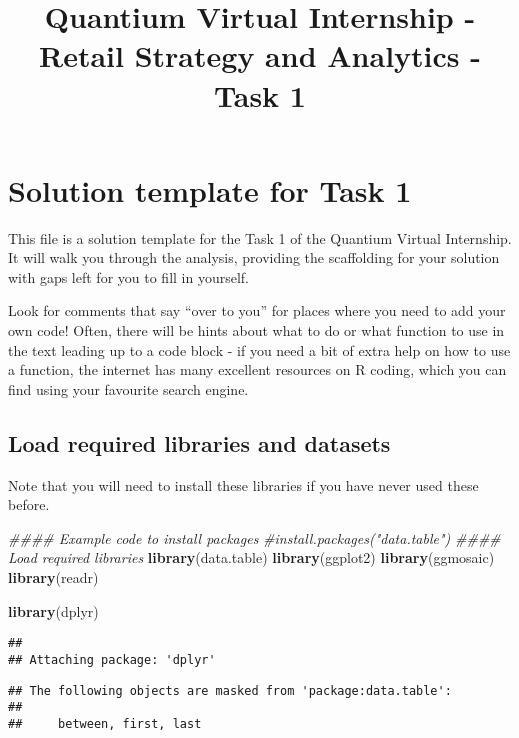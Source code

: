 \documentclass[]{article}
\title{Quantium Virtual Internship - Retail Strategy and Analytics - Task 1}
\author{}
\date{\vspace{-2.5em}}
\newenvironment{Shaded}{\begin{snugshade}}{\end{snugshade}}
\newcommand{\CommentTok}[1]{\textcolor[rgb]{0.56,0.35,0.01}{\textit{#1}}}
\newcommand{\KeywordTok}[1]{\textcolor[rgb]{0.13,0.29,0.53}{\textbf{#1}}}
\newcommand{\NormalTok}[1]{#1}
\begin{document}
\maketitle

\hypertarget{solution-template-for-task-1}{%
\section{Solution template for Task
1}\label{solution-template-for-task-1}}

This file is a solution template for the Task 1 of the Quantium Virtual
Internship. It will walk you through the analysis, providing the
scaffolding for your solution with gaps left for you to fill in
yourself.

Look for comments that say ``over to you'' for places where you need to
add your own code! Often, there will be hints about what to do or what
function to use in the text leading up to a code block - if you need a
bit of extra help on how to use a function, the internet has many
excellent resources on R coding, which you can find using your favourite
search engine.

\hypertarget{load-required-libraries-and-datasets}{%
\subsection{Load required libraries and
datasets}\label{load-required-libraries-and-datasets}}

Note that you will need to install these libraries if you have never
used these before.

\begin{Shaded}
\begin{Highlighting}[]
\CommentTok{#### Example code to install packages}
\CommentTok{#install.packages("data.table")}
\CommentTok{#### Load required libraries}
\KeywordTok{library}\NormalTok{(data.table)}
\KeywordTok{library}\NormalTok{(ggplot2)}
\KeywordTok{library}\NormalTok{(ggmosaic)}
\KeywordTok{library}\NormalTok{(readr)}

\KeywordTok{library}\NormalTok{(dplyr)}
\end{Highlighting}
\end{Shaded}

\begin{verbatim}
## 
## Attaching package: 'dplyr'
\end{verbatim}

\begin{verbatim}
## The following objects are masked from 'package:data.table':
## 
##     between, first, last
\end{verbatim}
\end{document}
